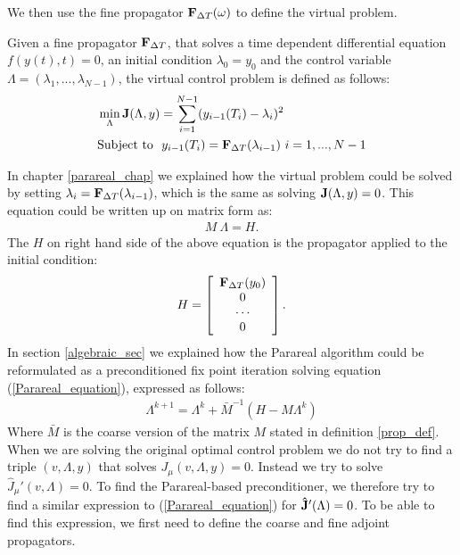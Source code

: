 \noindent
We then use the fine propagator $\bold F_{\Delta T}(\omega)$ to define the virtual problem.
\begin{definition}
Given a fine propagator $\bold F_{\Delta T}$, that solves a time dependent differential equation $f(y(t),t)=0$, an initial condition $\lambda_0=y_0$ and the control variable $\Lambda=(\lambda_1,...,\lambda_ {N-1})$, the virtual control problem is defined as follows:
\begin{align}
&\min_{\Lambda}\bold{J}(\Lambda,y) = \sum_{i=1}^{N-1} (y_{i-1}(T_{i})-\lambda_{i})^2 \label{virtual_func} \\
&\textrm{Subject to } \ y_{i-1}(T_{i}) = \bold F_{\Delta T}(\lambda_{i-1}) \ i=1,...,N-1 \label{virtual}
\end{align}
\end{definition}
\noindent
In chapter \ref{parareal_chap} we explained how the virtual problem could be solved by setting $\lambda_i= \bold F_{\Delta T}(\lambda_{i-1})$, which is the same as solving $\bold J(\Lambda,y)=0$. This equation could be written up on matrix form as:
\begin{align}
M \ \Lambda = H. \label{Parareal_equation}
\end{align}
The $H$ on right hand side of the above equation is the propagator applied to the initial condition:
\begin{align*}
H = \left[ \begin{array}{c}
   \bold F_{\Delta T}( y_0) \\
   0 \\
   \cdots \\
   0 \\
   \end{array}  \right].
\end{align*}
In section \ref{algebraic_sec} we explained how the Parareal algorithm could be reformulated as a preconditioned fix point iteration solving equation (\ref{Parareal_equation}), expressed as follows:
\begin{align}
\Lambda^{k+1} = \Lambda^k + \bar{M}^{-1}(H-M\Lambda^k)\label{par_mat_sys}
\end{align}
Where $\bar{M}$ is the coarse version of the matrix $M$ stated in definition \ref{prop_def}. When we are solving the original optimal control problem we do not try to find a triple $(v,\Lambda,y)$ that solves $J_{\mu}(v,\Lambda,y)=0$. Instead we try to solve $\hat J_{\mu}'(v,\Lambda)=0$. To find the Parareal-based preconditioner, we therefore try to find a similar expression to (\ref{Parareal_equation}) for $\bold{\hat{J}}'(\Lambda)=0$. To be able to find this expression, we first need to define the coarse and fine adjoint propagators.
